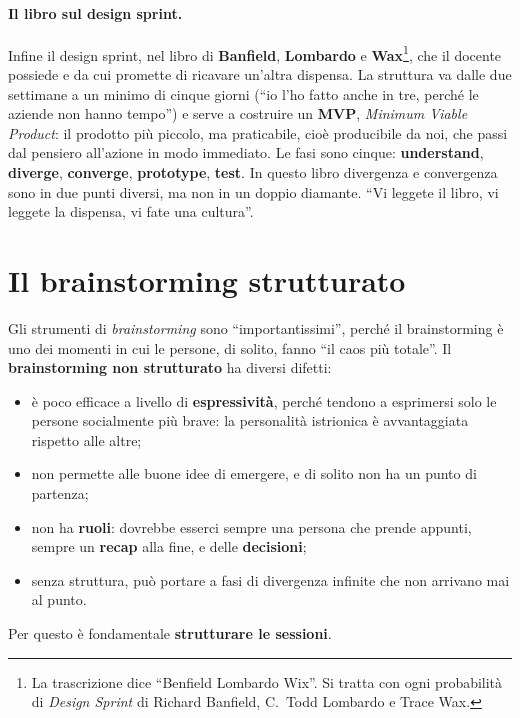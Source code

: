\paragraph{Il libro sul design sprint.} Infine il design sprint, nel libro di
\textbf{Banfield}, \textbf{Lombardo} e \textbf{Wax}\footnote{La trascrizione dice
``Benfield Lombardo Wix''. Si tratta con ogni probabilità di \emph{Design Sprint} di
Richard Banfield, C.~Todd Lombardo e Trace Wax.}, che il docente possiede e da cui
promette di ricavare un'altra dispensa. La struttura va dalle due settimane a un minimo di
cinque giorni (``io l'ho fatto anche in tre, perché le aziende non hanno tempo'') e serve
a costruire un \textbf{MVP}, \emph{Minimum Viable Product}: il prodotto più piccolo, ma
praticabile, cioè producibile da noi, che passi dal pensiero all'azione in modo immediato.
Le fasi sono cinque: \textbf{understand}, \textbf{diverge}, \textbf{converge},
\textbf{prototype}, \textbf{test}. In questo libro divergenza e convergenza sono in due
punti diversi, ma non in un doppio diamante. ``Vi leggete il libro, vi leggete la
dispensa, vi fate una cultura''.

\section{Il brainstorming strutturato}
\label{a5:sec:brainstorming}

Gli strumenti di \emph{brainstorming} sono ``importantissimi'', perché il brainstorming è
uno dei momenti in cui le persone, di solito, fanno ``il caos più totale''. Il
\textbf{brainstorming non strutturato} ha diversi difetti:
\begin{itemize}
  \item è poco efficace a livello di \textbf{espressività}, perché tendono a esprimersi
        solo le persone socialmente più brave: la personalità istrionica è avvantaggiata
        rispetto alle altre;
  \item non permette alle buone idee di emergere, e di solito non ha un punto di
        partenza;
  \item non ha \textbf{ruoli}: dovrebbe esserci sempre una persona che prende appunti,
        sempre un \textbf{recap} alla fine, e delle \textbf{decisioni};
  \item senza struttura, può portare a fasi di divergenza infinite che non arrivano mai
        al punto.
\end{itemize}
Per questo è fondamentale \textbf{strutturare le sessioni}.

